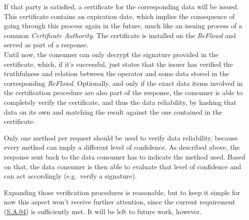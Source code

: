 \documentclass[12pt,english,a4paper,titlepage,cleardoublepage=empty,dottedtoc]{report}
\begin{document}
\begin{enumerate}
  If that party is satisfied, a certificate for the corresponding data
  will be issued. This certificate contains an expiration date, which
  implies the consequence of going through this process again in the
  future, much like an issuing process of a common \emph{Certificate
  Authority}. The certificate is installed on the \emph{ReFlowd} and
  served as part of a response.\\
  Until now, the consumer can only decrypt the signature provided in the
  certificate, which, if it's successful, just states that the issuer
  has verified the truthfulness and relation between the operator and
  some data stored in the corresponding \emph{ReFlowd}. Optionally, and
  only if the exact data items involved in the certification procedure
  are also part of the response, the consumer is able to completely
  verify the certificate, and thus the data reliability, by hashing that
  data on its own and matching the result against the one contained in
  the certificate.
\end{enumerate}

Only one method per request should be used to verify data reliability,
because every method can imply a different level of confidence. As
described above, the response sent back to the data consumer has to
indicate the method used. Based on that, the data consumer is then able
to evaluate that level of confidence and can act accordingly
(e.g.~verify a signature).

Expanding those verification procedures is reasonable, but to keep it
simple for now this aspect won't receive further attention, since the
current requirement (\protect\hyperlink{sa04}{S.A.04}) is sufficiently
met. It will be left to future work, however.
\end{document}
